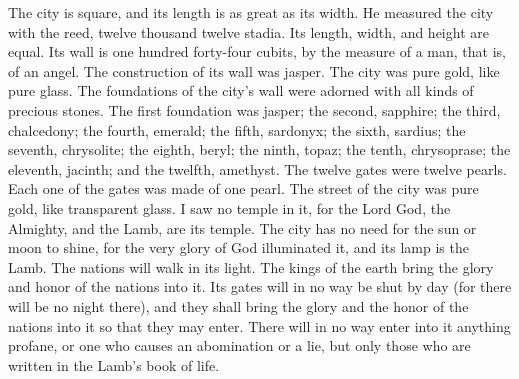 {The city is square, and its length is as great as its width. He measured the city with the reed, twelve thousand twelve stadia. Its length, width, and height are equal.
Its wall is one hundred forty-four cubits, by the measure of a man, that is, of an angel.
The construction of its wall was jasper. The city was pure gold, like pure glass.
The foundations of the city’s wall were adorned with all kinds of precious stones. The first foundation was jasper; the second, sapphire; the third, chalcedony; the fourth, emerald;
the fifth, sardonyx; the sixth, sardius; the seventh, chrysolite; the eighth, beryl; the ninth, topaz; the tenth, chrysoprase; the eleventh, jacinth; and the twelfth, amethyst.
The twelve gates were twelve pearls. Each one of the gates was made of one pearl. The street of the city was pure gold, like transparent glass.
I saw no temple in it, for the Lord God, the Almighty, and the Lamb, are its temple.
The city has no need for the sun or moon to shine, for the very glory of God illuminated it, and its lamp is the Lamb.
The nations will walk in its light. The kings of the earth bring the glory and honor of the nations into it.
Its gates will in no way be shut by day (for there will be no night there),
and they shall bring the glory and the honor of the nations into it so that they may enter.
There will in no way enter into it anything profane, or one who causes an abomination or a lie, but only those who are written in the Lamb’s book of life.

}

